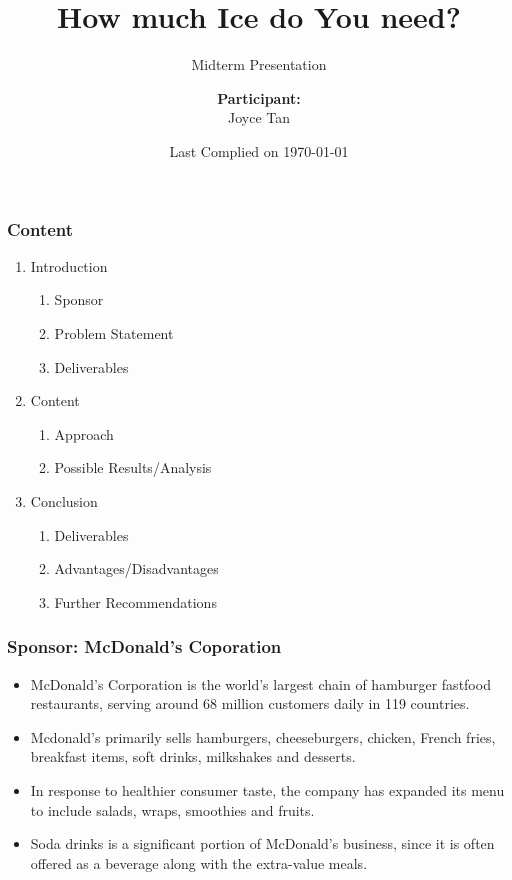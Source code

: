 \documentclass[compress,handout,10pt]{beamer}
\title{{\color{blue} \LARGE How much Ice do You need?\newline} }
\subtitle{{\color{red} \large Midterm Presentation} }
\author{ 
    {\bf{Participant:}} \\ 
Joyce Tan \\ 
    \vspace{5pt}
}
\institute{JHU AMS 2012 FALL}
\date{\mygreen Last Complied on \today}
\let\olditem\item
\renewcommand{\item}{\setlength{\itemsep}{0.5\baselineskip}\olditem}
\begin{document}
\begin{frame}[plain]
    \titlepage
\end{frame}


\begin{frame}
    \frametitle{Content}
    
    \vspace{7pt}
             \begin{enumerate}
                 \item Introduction
 		 \begin{enumerate}
                	 \item Sponsor
		\item Problem Statement
		\item Deliverables
		\end{enumerate}
                 \item Content
		\begin{enumerate}
                	 \item Approach
		\item Possible Results/Analysis
		\end{enumerate}
                 \item Conclusion
		\begin{enumerate}
                	 \item Deliverables
		\item Advantages/Disadvantages
		\item Further Recommendations
		\end{enumerate}
             \end{enumerate}
\end{frame}

\begin{frame}
    \frametitle{Sponsor: McDonald's Coporation}
    \begin{itemize}
        \item McDonald's Corporation is the world's largest chain of hamburger fastfood restaurants, serving around 68 million customers daily in 119 countries. 
	\item Mcdonald's primarily sells hamburgers, cheeseburgers, chicken, French fries, breakfast items, soft drinks, milkshakes and desserts. 
 	\item In response to healthier consumer taste, the company has expanded its menu to include salads, wraps, smoothies and fruits.
	 \item Soda drinks is a significant portion of McDonald's business, since it is often offered as a beverage along with the extra-value meals.
    \end{itemize}
\end{frame}
\end{document}

